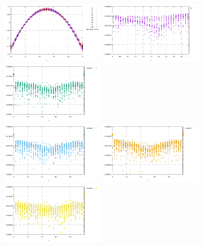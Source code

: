 \begin{center}
\includegraphics[width=5cm]{python_codes/fieldstone_12/results/rand/pressure}
\includegraphics[width=5cm]{python_codes/fieldstone_12/results/rand/p_error}
\includegraphics[width=5cm]{python_codes/fieldstone_12/results/rand/q1_error}\\
\includegraphics[width=5cm]{python_codes/fieldstone_12/results/rand/q2_error}
\includegraphics[width=5cm]{python_codes/fieldstone_12/results/rand/q3_error}
\includegraphics[width=5cm]{python_codes/fieldstone_12/results/rand/q4_error}\\

\end{center}
